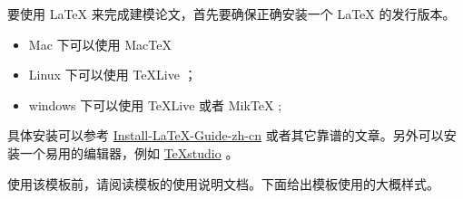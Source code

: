 \documentclass{cumcmthesis}
\begin{document}
要使用 \LaTeX{} 来完成建模论文，首先要确保正确安装一个 \LaTeX{} 的发行版本。

\begin{itemize}
    \item Mac 下可以使用 Mac\TeX{}
    \item Linux 下可以使用 \TeX{}Live ；
    \item windows 下可以使用 \TeX{}Live 或者 Mik\TeX{} ;
\end{itemize}

具体安装可以参考 \href{https://github.com/OsbertWang/install-latex-guide-zh-cn/releases/}{Install-LaTeX-Guide-zh-cn} 或者其它靠谱的文章。另外可以安装一个易用的编辑器，例如 \href{https://mirrors.tuna.tsinghua.edu.cn/github-release/texstudio-org/texstudio/LatestRelease/}{\TeX{}studio} 。

使用该模板前，请阅读模板的使用说明文档。下面给出模板使用的大概样式。
\end{document}
